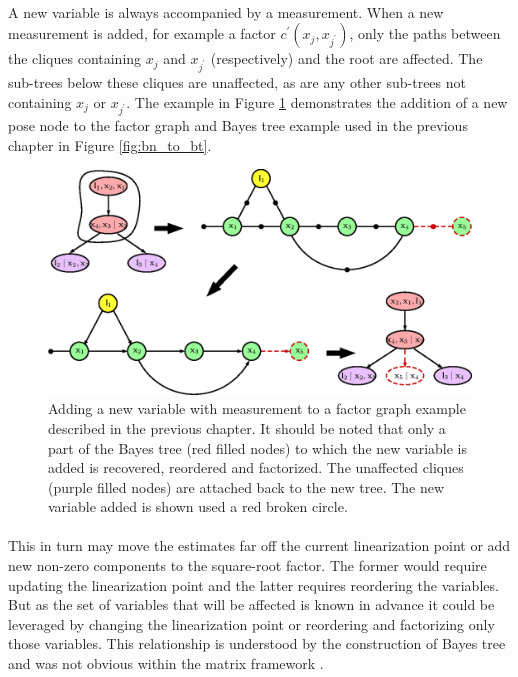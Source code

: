 \paragraph{}
A new variable is always accompanied by a measurement. When a new measurement is added, for example a factor $c^\prime(x_j,x_{j^\prime})$, only the paths between the cliques containing $x_j$ and $x_{j^\prime}$ (respectively) and the root are affected. The sub-trees below these cliques are unaffected, as are any other sub-trees not containing $x_j$ or $x_{j^\prime}$. The example in Figure \ref{fig:bt_add_var} demonstrates the addition of a new pose node to the factor graph and Bayes tree example used in the previous chapter in Figure \ref{fig:bn_to_bt}.
\begin{figure}
\centering
\includegraphics[width=\textwidth]{Chapters/figures3/bt_add_new_variable}
\caption{Adding a new variable with measurement to a factor graph example described in the previous chapter. It should be noted that only a part of the Bayes tree (red filled nodes) to which the new variable is added is recovered, reordered and factorized. The unaffected cliques (purple filled nodes) are attached back to the new tree. The new variable added is shown used a red broken circle.}
\label{fig:bt_add_var}
\end{figure}
\paragraph{}
This in turn may move the estimates far off the current linearization point or add new non-zero components to the square-root factor. The former would require updating the linearization point and the latter requires reordering the variables. But as the set of variables that will be affected is known in advance it could be leveraged by changing the linearization point or reordering and factorizing only those variables. This relationship is understood by the construction of Bayes tree and was not obvious within the matrix framework \cite{kaessbayestree}.  
